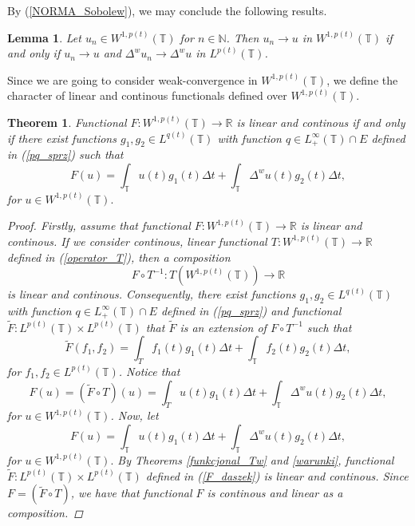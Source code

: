 \documentclass[12pt,a4paper,oneside,titlepage]{article}
\newtheorem{Twierdzenie}{Theorem}
\newtheorem{Lemat}{Lemma}
\begin{document}
\bigskip By (\ref{NORMA_Sobolew}), we may conclude the following results.
\begin{Lemat} \label{zbieznoscW1P} Let $u_n \in W^{1,p(t)}(\mathbb{T}) $ for $n \in \mathbb{N}$. Then
 $u_n \rightarrow u$ in $W^{1,p(t)}(\mathbb{T})$ if and only if $u_n \rightarrow u$ and $\Delta^{w} u_n \rightarrow \Delta^{w}u$ in $L^{p(t)}(\mathbb{T})$.
\end{Lemat}
Since we are going to consider weak-convergence in $W^{1,p(t)}(\mathbb{T})$, we define the character of linear and continous functionals defined over $W^{1,p(t)}(\mathbb{T})$.
\begin{Twierdzenie}
\label{funkcjonalWp}
 Functional $F: W^{1,p(t)}(\mathbb{T}) \rightarrow \mathbb{R}$ is linear and continous if and only if there exist functions $g_1, g_2 \in L^{q(t)}(\mathbb{T})$ with function $q \in L^{\infty}_{+}(\mathbb{T}) \cap E$ defined in (\ref{pq_sprz}) such that 
\begin{equation}
\nonumber
F(u) = \int_{\mathbb{T}} u(t) g_1(t) \Delta t + \int_{\mathbb{T}} \Delta^{w} u(t) g_2(t) \Delta t,
\end{equation}
for $u \in W^{1,p(t)}(\mathbb{T}).$
\begin{proof}
Firstly, assume that functional $F:W^{1,p(t)}(\mathbb{T}) \rightarrow \mathbb{R}$ is linear and continous.  If we consider continous, linear functional $T:W^{1,p(t)}(\mathbb{T}) \rightarrow \mathbb{R}$ defined in (\ref{operator_T}), then a composition
\begin{equation}
\nonumber
F \circ T^{-1}: T(W^{1,p(t)}(\mathbb{T})) \rightarrow \mathbb{R} 
\end{equation}
is linear and continous. Consequently, there exist functions $g_1, g_2 \in L^{q(t)}(\mathbb{T})$ with function $q \in L^{\infty}_{+}(\mathbb{T}) \cap E$ defined in (\ref{pq_sprz}) and functional $\widetilde{F}: L^{p(t)}(\mathbb{T}) \times L^{p(t)}(\mathbb{T}) $ that $\widetilde{F}$ is an extension of $F \circ T^{-1}$  such that 
\begin{equation}
\label{F_daszek}
\widetilde{F} (f_1, f_2 ) = \int_{T} f_1(t) g_1(t) \Delta t + \int_{\mathbb{T}} f_2(t) g_2(t) \Delta t, 
\end{equation}
for $f_1, f_2 \in L^{p(t)}(\mathbb{T})$. Notice that
\begin{equation}
\nonumber
F(u) =( \widetilde{F} \circ T) (u) =  \int_{T} u(t) g_1(t) \Delta t + \int_{\mathbb{T}} \Delta^{w}u(t) g_2(t) \Delta t,
\end{equation}
for $u \in W^{1,p(t)}(\mathbb{T})$. Now, let 
\begin{equation}
\nonumber
F(u) = \int_{\mathbb{T}} u(t) g_1(t) \Delta t + \int_{\mathbb{T}} \Delta^{w} u(t) g_2(t) \Delta t,
\end{equation}
 for $u \in W^{1,p(t)}(\mathbb{T}).$ By Theorems \ref{funkcjonal_Tw} and \ref{warunki}, functional $\widetilde{F}: L^{p(t)}(\mathbb{T}) \times L^{p(t)}(\mathbb{T}) $ defined in (\ref{F_daszek}) is linear and continous. Since $F =( \widetilde{F} \circ T)$, we have that functional $F$ is continous and linear as a composition. 
\end{proof}
\end{Twierdzenie}
\end{document}
